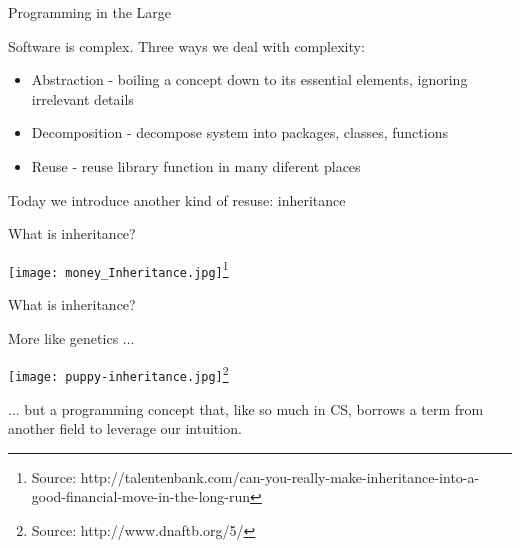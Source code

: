 \documentclass{beamer}
\author[Chris Simpkins] 
{Christopher Simpkins \\\texttt{chris.simpkins@gatech.edu}}
\institute[Georgia Tech] %
\date{}
\begin{document}
\begin{frame}
  \titlepage
\end{frame}

\begin{frame}[fragile]{Programming in the Large}


Software is complex.  Three ways we deal with complexity:
\begin{itemize}
\item Abstraction - boiling a concept down to its essential elements, ignoring irrelevant details
\item Decomposition - decompose system into packages, classes, functions
\item Reuse - reuse library function in many diferent places
\end{itemize}
\vspace{.1in}
Today we introduce another kind of resuse: inheritance

\end{frame}

\begin{frame}[fragile]{What is inheritance?}

\begin{center}
\texttt{[image: money\_Inheritance.jpg]}\footnote{Source: http://talentenbank.com/can-you-really-make-inheritance-into-a-good-financial-move-in-the-long-run}
\end{center}

\end{frame}

\begin{frame}[fragile]{What is inheritance?}


More like genetics ...
\begin{center}
\texttt{[image: puppy-inheritance.jpg]}\footnote{Source: http://www.dnaftb.org/5/}\\
\end{center}
... but a programming concept that, like so much in CS, borrows a term from another field to leverage our intuition.

\end{frame}
\end{document}
